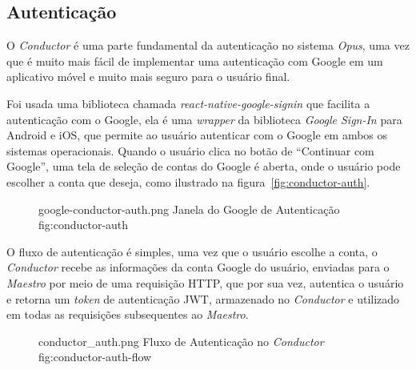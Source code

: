 \subsection{Autenticação}
\label{subsec:conductor-auth}

O \emph{Conductor} é uma parte fundamental da autenticação no sistema \emph{Opus}, uma vez que é muito mais fácil de implementar uma autenticação com Google
em um aplicativo móvel e muito mais seguro para o usuário final.

Foi usada uma biblioteca chamada \emph{react-native-google-signin} que facilita a autenticação com o Google, ela é uma \emph{wrapper} da biblioteca
\emph{Google Sign-In} para Android e iOS, que permite ao usuário autenticar com o Google em ambos os sistemas operacionais. Quando o usuário
clica no botão de ``Continuar com Google'', uma tela de seleção de contas do Google é aberta, onde o usuário pode escolher a conta que deseja,
como ilustrado na figura~\ref{fig:conductor-auth}.

\begin{figure}[ht]
    {google-conductor-auth.png}
    {Janela do Google de Autenticação}
    {fig:conductor-auth}
\end{figure}

O fluxo de autenticação é simples, uma vez que o usuário escolhe a conta, o \emph{Conductor} recebe as informações da conta Google do usuário, enviadas 
para o \emph{Maestro} por meio de uma requisição HTTP, que por sua vez, autentica o usuário e retorna um \emph{token} de autenticação JWT, 
armazenado no \emph{Conductor} e utilizado em todas as requisições subsequentes ao \emph{Maestro}.

\begin{figure}[ht]
    {conductor_auth.png}
    {Fluxo de Autenticação no \emph{Conductor}}
    {fig:conductor-auth-flow}
\end{figure}